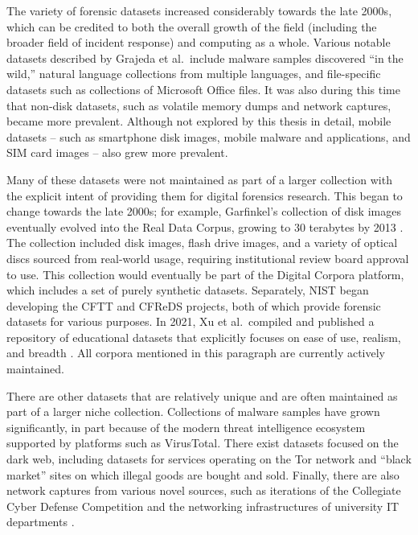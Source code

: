 The variety of forensic datasets increased considerably towards the late
2000s, which can be credited to both the overall growth of the field
(including the broader field of incident response) and computing as a
whole. Various notable datasets described by Grajeda et al.~include
malware samples discovered ``in the wild,'' natural language collections
from multiple languages, and file-specific datasets such as collections
of Microsoft Office files. It was also during this time that non-disk
datasets, such as volatile memory dumps and network captures, became
more prevalent. Although not explored by this thesis in detail, mobile
datasets -- such as smartphone disk images, mobile malware and
applications, and SIM card images -- also grew more prevalent.

Many of these datasets were not maintained as part of a larger
collection with the explicit intent of providing them for digital
forensics research. This began to change towards the late 2000s; for
example, Garfinkel's collection of disk images eventually evolved into
the Real Data Corpus, growing to 30 terabytes by 2013
\cite{garfinkelBringingScienceDigital2009,yannikosDataCorporaDigital2014}.
The collection included disk images, flash drive images, and a variety
of optical discs sourced from real-world usage, requiring institutional
review board approval to use. This collection would eventually be part
of the Digital Corpora platform, which includes a set of purely
synthetic datasets. Separately, NIST began developing the CFTT and
CFReDS projects, both of which provide forensic datasets for various
purposes. In 2021, Xu et al.~compiled and published a repository of
educational datasets that explicitly focuses on ease of use, realism,
and breadth \cite{xuDesigningSharedDigital2022}. All corpora
mentioned in this paragraph are currently actively maintained.

There are other datasets that are relatively unique and are often
maintained as part of a larger niche collection. Collections of malware
samples have grown significantly, in part because of the modern threat
intelligence ecosystem supported by platforms such as VirusTotal. There
exist datasets focused on the dark web, including datasets for services
operating on the Tor network and ``black market'' sites on which illegal
goods are bought and sold. Finally, there are also network captures from
various novel sources, such as iterations of the Collegiate Cyber
Defense Competition and the networking infrastructures of university IT
departments \cite{grajedaAvailabilityDatasetsDigital2017}.

